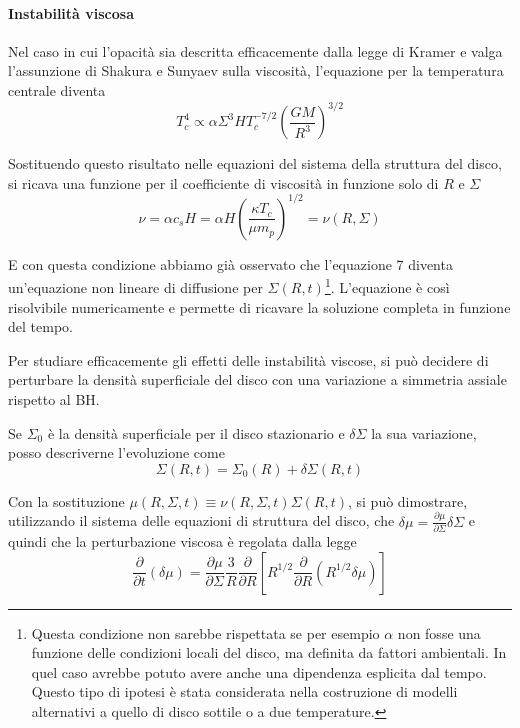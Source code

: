 \documentclass[a4paperbi]{article}
\begin{document}
	\paragraph{Instabilità viscosa}
	
	Nel caso in cui l'opacità sia descritta efficacemente dalla legge di Kramer e valga l'assunzione di Shakura e Sunyaev sulla viscosità, l'equazione per la temperatura centrale diventa
	\begin{equation*}
		T^4_c\propto\alpha\Sigma^3HT_c^{-7/2}\left(\frac{GM}{R^3}\right)^{3/2}
	\end{equation*}
	
	Sostituendo questo risultato nelle equazioni del sistema della struttura del disco, si ricava una funzione per il coefficiente di viscosità in funzione solo di $R$ e $\Sigma$
	\begin{equation*}
		\nu=\alpha c_sH=\alpha H\left(\frac{\kappa T_c}{\mu m_p}\right)^{1/2}=\nu(R,\Sigma)
	\end{equation*}
	
	E con questa condizione abbiamo già osservato che l'equazione 7 diventa un'equazione non lineare di diffusione per $\Sigma(R,t)$\footnote{Questa condizione non sarebbe rispettata se per esempio $\alpha$ non fosse una funzione delle condizioni locali del disco, ma definita da fattori ambientali. In quel caso avrebbe potuto avere anche una dipendenza esplicita dal tempo. Questo tipo di ipotesi è stata considerata nella costruzione di modelli alternativi a quello di disco sottile o a due temperature.}. L'equazione è così risolvibile numericamente e permette di ricavare la soluzione completa in funzione del tempo.

	Per studiare efficacemente gli effetti delle instabilità viscose, si può decidere di perturbare la densità superficiale del disco con una variazione a simmetria assiale rispetto al BH.
	
	Se $\Sigma_0$ è la densità superficiale per il disco stazionario e $\delta\Sigma$ la sua variazione, posso descriverne l'evoluzione come
	\begin{equation}
		\Sigma(R,t)=\Sigma_0(R)+\delta\Sigma(R,t)
	\end{equation}
	
	Con la sostituzione $\mu(R,\Sigma,t)\equiv\nu(R,\Sigma,t)\Sigma(R,t)$, si può dimostrare, utilizzando il sistema delle equazioni di struttura del disco, che $\delta\mu=\frac{\partial\mu}{\partial\Sigma}\delta\Sigma$ e quindi che la perturbazione viscosa è regolata dalla legge
	\begin{equation}
		\frac{\partial}{\partial t}(\delta\mu)=\frac{\partial\mu}{\partial\Sigma}\frac{3}{R}\frac{\partial}{\partial R}\left[R^{1/2}\frac{\partial}{\partial R}(R^{1/2}\delta\mu)\right]
	\end{equation}
	
\end{document}
